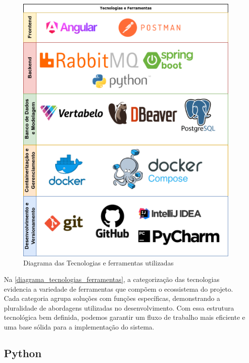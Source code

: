 \documentclass[
	12pt,				%
	oneside,			%
	a4paper,			%
	english,			%
	french,				%
	spanish,			%
	brazil				%
	]{abntex2}
\begin{document}
\begin{figure}[htbp]
\hypertarget{diagrama_tecnologias_ferramentas}{%
\caption{Diagrama das Tecnologias e ferramentas utilizadas}\label{diagrama_tecnologias_ferramentas}
\begin{center}
\includegraphics[scale=0.5]{imagens/sentilytics/diagramas/tecnologias-ferramentas.png}
\end{center}
}
\end{figure}

Na \autoref{diagrama_tecnologias_ferramentas}, a categorização das
tecnologias evidencia a variedade de ferramentas que compõem o
ecossistema do projeto. Cada categoria agrupa soluções com funções
específicas, demonstrando a pluralidade de abordagens utilizadas no
desenvolvimento. Com essa estrutura tecnológica bem definida, podemos
garantir um fluxo de trabalho mais eficiente e uma base sólida para a
implementação do sistema.

\hypertarget{python}{%
\subsection{Python}\label{python}}
\end{document}
